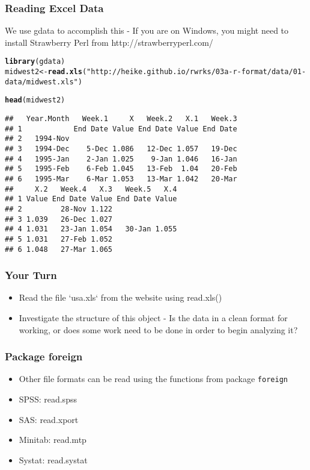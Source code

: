 \documentclass{beamer}\usepackage[]{graphicx}\usepackage[]{color}
\makeatletter
\newcommand{\hlstr}[1]{\textcolor[rgb]{0.192,0.494,0.8}{#1}}%
\newcommand{\hlstd}[1]{\textcolor[rgb]{0.345,0.345,0.345}{#1}}%
\newcommand{\hlkwb}[1]{\textcolor[rgb]{0.69,0.353,0.396}{#1}}%
\newcommand{\hlkwd}[1]{\textcolor[rgb]{0.737,0.353,0.396}{\textbf{#1}}}%
\newenvironment{kframe}{%
 \def\at@end@of@kframe{}%
 \ifinner\ifhmode%
  \def\at@end@of@kframe{\end{minipage}}%
  \begin{minipage}{\columnwidth}%
 \fi\fi%
 \def\FrameCommand##1{\hskip\@totalleftmargin \hskip-\fboxsep
 \colorbox{shadecolor}{##1}\hskip-\fboxsep
     \hskip-\linewidth \hskip-\@totalleftmargin \hskip\columnwidth}%
 \MakeFramed {\advance\hsize-\width
   \@totalleftmargin\z@ \linewidth\hsize
   \@setminipage}}%
 {\par\unskip\endMakeFramed%
 \at@end@of@kframe}
\newenvironment{knitrout}{}{} %
\makeatother
\begin{document}
\begin{frame}[fragile]
\frametitle{Reading Excel Data}
We use gdata to accomplish this - If you are on Windows, you might need to install Strawberry Perl from http://strawberryperl.com/
\begin{knitrout}\scriptsize
{}\color{fgcolor}\begin{kframe}
\begin{alltt}
\hlkwd{library}\hlstd{(gdata)}
\hlstd{midwest2} \hlkwb{<-} \hlkwd{read.xls}\hlstd{(}\hlstr{"http://heike.github.io/rwrks/03a-r-format/data/01-data/midwest.xls"}\hlstd{)}

\hlkwd{head}\hlstd{(midwest2)}
\end{alltt}
\begin{verbatim}
##   Year.Month   Week.1     X   Week.2   X.1   Week.3
## 1            End Date Value End Date Value End Date
## 2   1994-Nov                                       
## 3   1994-Dec    5-Dec 1.086   12-Dec 1.057   19-Dec
## 4   1995-Jan    2-Jan 1.025    9-Jan 1.046   16-Jan
## 5   1995-Feb    6-Feb 1.045   13-Feb  1.04   20-Feb
## 6   1995-Mar    6-Mar 1.053   13-Mar 1.042   20-Mar
##     X.2   Week.4   X.3   Week.5   X.4
## 1 Value End Date Value End Date Value
## 2         28-Nov 1.122               
## 3 1.039   26-Dec 1.027               
## 4 1.031   23-Jan 1.054   30-Jan 1.055
## 5 1.031   27-Feb 1.052               
## 6 1.048   27-Mar 1.065
\end{verbatim}
\end{kframe}
\end{knitrout}
\end{frame}

\begin{frame}
\frametitle{Your Turn}
\begin{itemize}
\item Read the file `usa.xls` from the website using read.xls()
\item Investigate the structure of this object - Is the data in a clean format for working, or does some work need to be done in order to begin analyzing it?
\end{itemize}
\end{frame}

\begin{frame}
\frametitle{Package foreign}
\begin{itemize}
\item Other file formats can be read using the functions from package \texttt{foreign}
\item SPSS: read.spss
\item SAS: read.xport
\item Minitab: read.mtp
\item Systat: read.systat
\end{itemize}
\end{frame}
\end{document}
